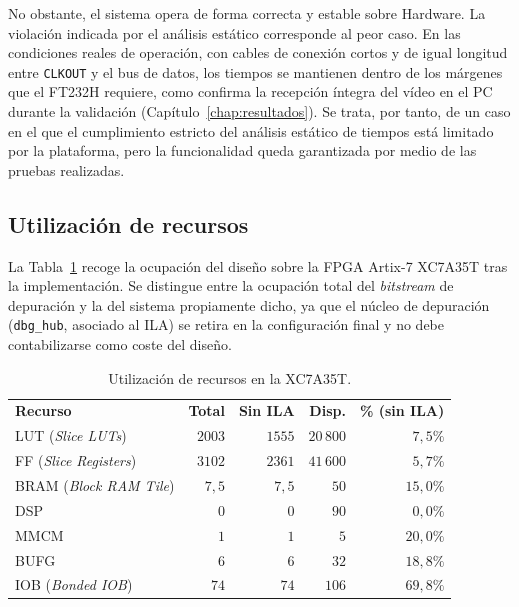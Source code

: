 \documentclass[../main.tex]{subfiles}
\begin{document}
No obstante, el sistema opera de forma correcta y estable sobre Hardware. La violación indicada por el análisis estático corresponde al peor caso. En las condiciones reales de operación, con cables de conexión cortos y de igual longitud entre \texttt{CLKOUT} y el bus de datos, los tiempos se mantienen dentro de los márgenes que el FT232H requiere, como confirma la recepción íntegra del vídeo en el PC durante la validación (Capítulo~\ref{chap:resultados}). Se trata, por tanto, de un caso en el que el cumplimiento estricto del análisis estático de tiempos está limitado por la plataforma, pero la funcionalidad queda garantizada por medio de las pruebas realizadas.


\subsection{Utilización de recursos}
\label{sec:recursos}

La Tabla~\ref{tab:recursos} recoge la ocupación del diseño sobre la \ac{FPGA} Artix-7 XC7A35T tras la implementación. Se distingue entre la ocupación total del \textit{bitstream} de depuración y la del sistema propiamente dicho, ya que el núcleo de depuración (\texttt{dbg\_hub}, asociado al \ac{ILA}) se retira en la configuración final y no debe contabilizarse como coste del diseño.

\begin{table}[H]
\centering
\caption{Utilización de recursos en la XC7A35T.}
\label{tab:recursos}
\begin{tabular}{lrrrr}
\rowcolor[HTML]{156082}
{\color{white}\textbf{Recurso}} & {\color{white}\textbf{Total}} & {\color{white}\textbf{Sin ILA}} & {\color{white}\textbf{Disp.}} & {\color{white}\textbf{\% (sin ILA)}} \\
\rowcolor[HTML]{C0E6F5}
LUT (\textit{Slice LUTs}) & $2003$ & $1555$ & $20\,800$ & $7{,}5\%$ \\
FF (\textit{Slice Registers}) & $3102$ & $2361$ & $41\,600$ & $5{,}7\%$ \\
\rowcolor[HTML]{C0E6F5}
BRAM (\textit{Block RAM Tile}) & $7{,}5$ & $7{,}5$ & $50$ & $15{,}0\%$ \\
DSP & $0$ & $0$ & $90$ & $0{,}0\%$ \\
\rowcolor[HTML]{C0E6F5}
MMCM & $1$ & $1$ & $5$ & $20{,}0\%$ \\
BUFG & $6$ & $6$ & $32$ & $18{,}8\%$ \\
\rowcolor[HTML]{C0E6F5}
IOB (\textit{Bonded IOB}) & $74$ & $74$ & $106$ & $69{,}8\%$ \\
\end{tabular}
\end{table}
\end{document}
